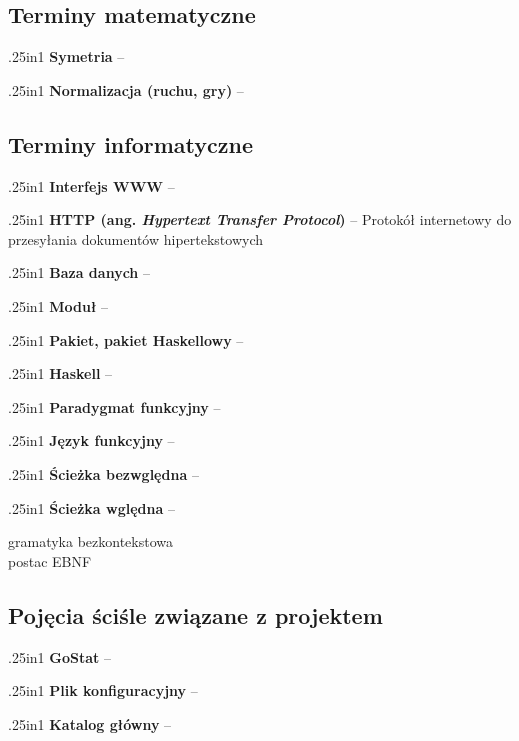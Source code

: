 \documentclass[12pt,leqno]{article}
\newcommand{\entry}[2]{
 \begin{hangparas}{.25in}{1}
  \noindent \textbf{#1} -- #2 \\
 \end{hangparas}
}
\begin{document}
\subsection{Terminy matematyczne}

\entry{Symetria}{}

\entry{Normalizacja (ruchu, gry)}{}

\subsection{Terminy informatyczne}

\entry{Interfejs WWW}{}

\entry{HTTP (ang. \emph{Hypertext Transfer Protocol})}{Protokół internetowy do przesyłania dokumentów hipertekstowych}

\entry{Baza danych}{}

\entry{Moduł}{}

\entry{Pakiet, pakiet Haskellowy}{}

\entry{Haskell}{}

\entry{Paradygmat funkcyjny}{}

\entry{Język funkcyjny}{}

\entry{Ścieżka bezwględna}{}

\entry{Ścieżka wględna}{}

gramatyka bezkontekstowa \\
postac EBNF \\ 

\subsection{Pojęcia ściśle związane z projektem}

\entry{GoStat}{}

\entry{Plik konfiguracyjny}{}

\entry{Katalog główny}{}
\end{document}
